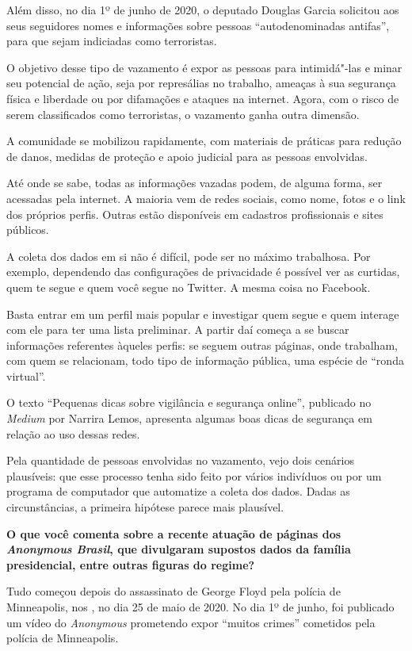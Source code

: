 Além disso, no dia 1º de junho de 2020, o deputado Douglas Garcia
solicitou aos seus seguidores nomes e informações sobre pessoas
``autodenominadas antifas'', para que sejam indiciadas como terroristas.

O objetivo desse tipo de vazamento é expor as pessoas para intimidá"-las
e minar seu potencial de ação, seja por represálias no trabalho, ameaças
à sua segurança física e liberdade ou por difamações e ataques na
internet. Agora, com o risco de serem classificados como terroristas, o
vazamento ganha outra dimensão.

A comunidade se mobilizou rapidamente, com materiais de práticas para
redução de danos, medidas de proteção e apoio judicial para as pessoas
envolvidas.

Até onde se sabe, todas as informações vazadas podem, de alguma forma, ser
acessadas pela internet. A maioria vem de redes sociais, como nome,
fotos e o link dos próprios perfis. Outras estão disponíveis em
cadastros profissionais e sites públicos.

A coleta dos dados em si não é difícil, pode ser no máximo trabalhosa.
Por exemplo, dependendo das configurações de privacidade é possível ver
as curtidas, quem te segue e quem você segue no Twitter. A mesma coisa
no Facebook.

Basta entrar em um perfil mais popular e investigar quem segue e quem
interage com ele para ter uma lista preliminar. A partir daí começa a se
buscar informações referentes àqueles perfis: se seguem outras páginas,
onde trabalham, com quem se relacionam, todo tipo de informação pública,
uma espécie de ``ronda virtual''.

O texto ``Pequenas dicas sobre vigilância e segurança online'', publicado no \emph{Medium} por Narrira Lemos, apresenta algumas boas dicas de segurança em relação ao uso
dessas redes.

Pela quantidade de pessoas envolvidas no vazamento, vejo dois cenários
plausíveis: que esse processo tenha sido feito por vários indivíduos ou
por um programa de computador que automatize a coleta dos dados. Dadas
as circunstâncias, a primeira hipótese parece mais plausível.

\bigskip

\noindent{}\textbf{O que você comenta sobre a recente atuação de páginas dos \emph{Anonymous Brasil}, que divulgaram supostos dados da família presidencial, entre
outras figuras do regime?}

Tudo começou depois do assassinato de George Floyd
pela polícia de Minneapolis, nos , no dia 25 de maio de 2020. No dia
1º de junho, foi publicado um vídeo do \emph{Anonymous} prometendo expor
``muitos crimes'' cometidos pela polícia de Minneapolis.

